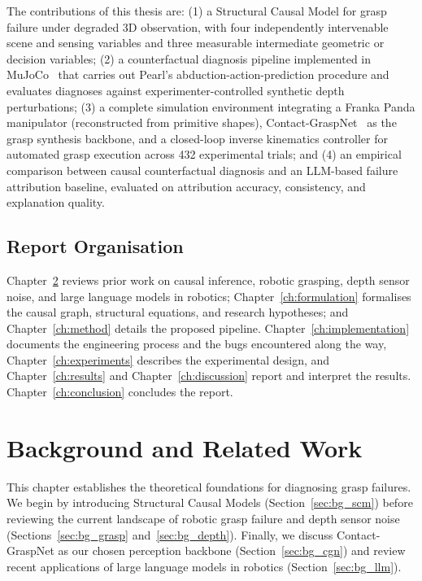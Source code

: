\documentclass[11pt,a4paper]{report}
\begin{document}
The contributions of this thesis are: (1) a Structural Causal Model for grasp failure under degraded 3D observation, with four independently intervenable scene and sensing variables and three measurable intermediate geometric or decision variables; (2) a counterfactual diagnosis pipeline implemented in MuJoCo~\cite{todorov2012mujoco} that carries out Pearl's abduction-action-prediction procedure and evaluates diagnoses against experimenter-controlled synthetic depth perturbations; (3) a complete simulation environment integrating a Franka Panda manipulator (reconstructed from primitive shapes), Contact-GraspNet~\cite{sundermeyer2021contact} as the grasp synthesis backbone, and a closed-loop inverse kinematics controller for automated grasp execution across 432 experimental trials; and (4) an empirical comparison between causal counterfactual diagnosis and an LLM-based failure attribution baseline, evaluated on attribution accuracy, consistency, and explanation quality.

\section{Report Organisation}
\label{sec:organisation}

Chapter~\ref{ch:background} reviews prior work on causal inference, robotic grasping, depth sensor noise, and large language models in robotics; Chapter~\ref{ch:formulation} formalises the causal graph, structural equations, and research hypotheses; and Chapter~\ref{ch:method} details the proposed pipeline. Chapter~\ref{ch:implementation} documents the engineering process and the bugs encountered along the way, Chapter~\ref{ch:experiments} describes the experimental design, and Chapter~\ref{ch:results} and Chapter~\ref{ch:discussion} report and interpret the results. Chapter~\ref{ch:conclusion} concludes the report.


\chapter{Background and Related Work}
\label{ch:background}

This chapter establishes the theoretical foundations for diagnosing grasp failures. We begin by introducing Structural Causal Models (Section~\ref{sec:bg_scm}) before reviewing the current landscape of robotic grasp failure and depth sensor noise (Sections~\ref{sec:bg_grasp} and~\ref{sec:bg_depth}). Finally, we discuss Contact-GraspNet as our chosen perception backbone (Section~\ref{sec:bg_cgn}) and review recent applications of large language models in robotics (Section~\ref{sec:bg_llm}).
\end{document}
